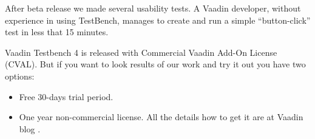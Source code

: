 After beta release we made several usability tests.
A Vaadin developer, without experience in using TestBench, manages to create and 
run a simple ``button-click'' test in less that 15 minutes. 

Vaadin Testbench 4 is released with Commercial Vaadin Add-On License 
(CVAL). But if you want to look results of our work and try it out you have two
options:

\begin{itemize}
  \item Free 30-days trial period.
  \item One year non-commercial license. All the details how to get it are at
  Vaadin blog \cite{vaadinBlog}.
\end{itemize}